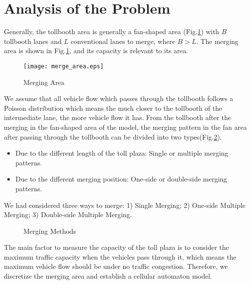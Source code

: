 \documentclass{mcmthesis}
\begin{document}
\section{Analysis of the Problem}
Generally, the tollbooth area is generally a fan-shaped area  (Fig.\ref{fig:merge_area}) with $B$ tollbooth lanes and $L$ conventional lanes to merge, where $B > L$. The merging area is shown in Fig.\ref{fig:merge_area}, and its capacity is relevant to its area\cite{woo1991toll}.
\begin{figure}[!h]
	\centering
	\texttt{[image: merge\_area.eps]}
	\caption{\label{fig:merge_area}Merging Area}
\end{figure}

We assume that all vehicle flow which passes through the tollbooth follows a Poisson distribution which means the much closer to the tollbooth of the intermediate lane, the more vehicle flow it has. From the tollbooth after the merging in the fan-shaped area of the model, the merging pattern in the fan area after passing through the tollbooth can be divided into two types(Fig.\ref{fig:merge_ways}).
\begin{itemize}
	\item Due to the different length of the toll plaza: Single or multiple merging patterns.
	\item Due to the different merging position: One-side or double-side merging patterns.
\end{itemize}
We had considered three ways to merge: 1) Single Merging; 2) One-side Multiple Merging; 
3) Double-side Multiple Merging.
\begin{figure}[!htbp]
	\centering
	\caption{\label{fig:merge_ways}Merging Methods}
\end{figure}

The main factor to measure the capacity of the toll plaza is to consider the maximum traffic capacity when the vehicles pass through it, which means the maximum vehicle flow should be under no traffic congestion. Therefore, we discretize the merging area and establish a cellular automaton model.
\end{document}
